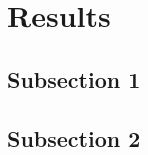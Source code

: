
\section{Results}
\label{sec:results}

\blindtext

\subsection{Subsection 1}
\label{subsec:results_1}

\blindtext

\subsection{Subsection 2}
\label{subsec:results_2}

\blindtext